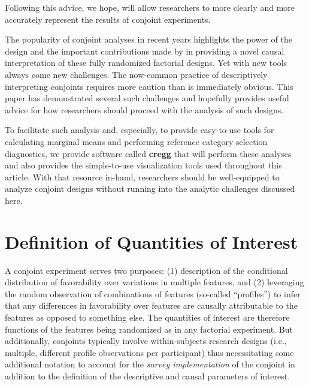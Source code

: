 \documentclass[a4paper,12pt]{article}\usepackage[]{graphicx}\usepackage[]{color}
\begin{document}
\noindent Following this advice, we hope, will allow researchers to more clearly and more accurately represent the results of conjoint experiments.

The popularity of conjoint analyses in recent years highlights the power of the design and the important contributions made by \citet{HainmuellerHopkinsYamamoto2014} in providing a novel causal interpretation of these fully randomized factorial designs. Yet with new tools always come new challenges. The now-common practice of descriptively interpreting conjoints requires more caution than is immediately obvious. This paper has demonstrated several such challenges and hopefully provides useful advice for how researchers should proceed with the analysis of such designs.

To facilitate such analysis and, especially, to provide easy-to-use tools for calculating marginal means and performing reference category selection diagnostics, we provide software called \textbf{cregg} \citep{Leeper2018cregg} that will perform these analyses and also provides the simple-to-use visualization tools used throughout this article. With that resource in-hand, researchers should be well-equipped to analyze conjoint designs without running into the analytic challenges discussed here.



\singlespacing


\clearpage


\appendix
\tableofcontents



\clearpage

\section{Definition of Quantities of Interest}\label{app:quantities}

A conjoint experiment serves two purposes: (1) description of the conditional distribution of favorability over variations in multiple features, and (2) leveraging the random observation of combinations of features (so-called ``profiles'') to infer that any differences in favorability over features are causally attributable to the features as opposed to something else. The quantities of interest are therefore functions of the features being randomized as in any factorial experiment. But additionally, conjoints typically involve within-subjects research designs (i.e., multiple, different profile observations per participant) thus necessitating some additional notation to account for the \textit{survey implementation} of the conjoint in addition to the definition of the descriptive and causal parameters of interest.
\end{document}
